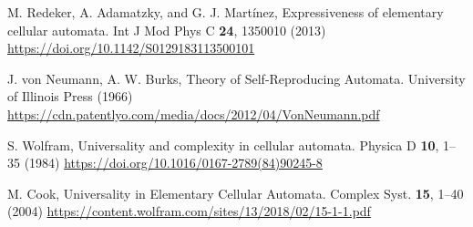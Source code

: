 \begin{thebibliography}{04}
\raggedright
M. Redeker, A. Adamatzky, and G. J. Martínez,
Expressiveness of elementary cellular automata.
Int J Mod Phys C \textbf{24}, 1350010 (2013)
\url{https://doi.org/10.1142/S0129183113500101}

\raggedright
J. von Neumann, A. W. Burks, 
Theory of Self-Reproducing Automata. 
University of Illinois Press (1966)
\url{https://cdn.patentlyo.com/media/docs/2012/04/VonNeumann.pdf}

\raggedright
S. Wolfram,
Universality and complexity in cellular automata.
Physica D \textbf{10}, 1--35 (1984)
\url{https://doi.org/10.1016/0167-2789(84)90245-8}

\raggedright
M. Cook,
Universality in Elementary Cellular Automata.
Complex Syst. \textbf{15}, 1--40 (2004) 
\url{https://content.wolfram.com/sites/13/2018/02/15-1-1.pdf}

\end{thebibliography}


